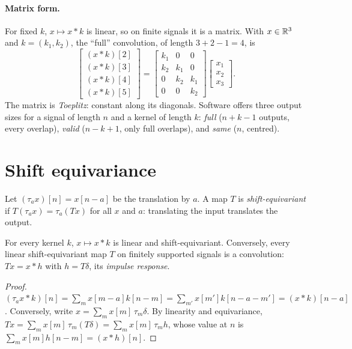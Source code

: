 \begin{notechapter}
\paragraph{Matrix form.} For fixed $k$, $x\mapsto x * k$ is linear, so on finite signals it is a matrix.
With $x\in\mathbb{R}^3$ and $k = (k_1, k_2)$, the ``full'' convolution, of length $3 + 2 - 1 = 4$, is
\[
  \begin{bmatrix}(x * k)[2]\\(x * k)[3]\\(x * k)[4]\\(x * k)[5]\end{bmatrix}
  = \begin{bmatrix}k_1 & 0 & 0\\ k_2 & k_1 & 0\\ 0 & k_2 & k_1\\ 0 & 0 & k_2\end{bmatrix}
  \begin{bmatrix}x_1\\x_2\\x_3\end{bmatrix} .
\]
The matrix is \emph{Toeplitz}: constant along its diagonals. Software offers three output
sizes for a signal of length $n$ and a kernel of length $k$: \emph{full} ($n + k - 1$ outputs, every
overlap), \emph{valid} ($n - k + 1$, only full overlaps), and \emph{same} ($n$, centred).

\section{Shift equivariance}\label{convolution-filtering:sec:equivariance}

Let $(\tau_ax)[n] = x[n - a]$ be the translation by $a$. A map $T$ is \emph{shift-equivariant} if $T(\tau_ax) = \tau_a(Tx)$
for all $x$ and $a$: translating the input translates the output.

\begin{theorem}\label{convolution-filtering:thm:lti}
For every kernel $k$, $x\mapsto x * k$ is linear and shift-equivariant. Conversely, every linear
shift-equivariant map $T$ on finitely supported signals is a convolution: $Tx = x * h$ with
$h = T\delta$, its \emph{impulse response}.
\end{theorem}

\begin{proof}
$(\tau_ax * k)[n] = \sum_mx[m - a]k[n - m] = \sum_{m'}x[m']k[n - a - m'] = (x * k)[n - a]$. Conversely, write
$x = \sum_mx[m]\,\tau_m\delta$. By linearity and equivariance, $Tx = \sum_mx[m]\,\tau_m(T\delta) = \sum_mx[m]\,\tau_mh$, whose value at $n$ is
$\sum_mx[m]h[n - m] = (x * h)[n]$.
\end{proof}


\end{notechapter}
